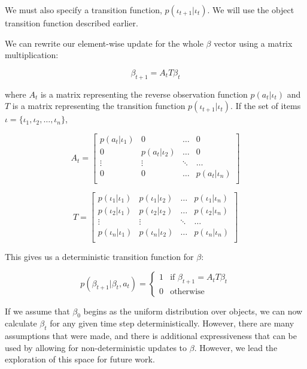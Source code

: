 \documentclass{article}
\begin{document}
\begin{multicols}{2}
We must also specify a transition function, $p(\iota_{t+1} | \iota_t)$. We will use the object transition function described earlier. 

We can rewrite our element-wise update for the whole $\beta$ vector using a matrix multiplication: 


$$\beta_{t+1} = A_{t}T \beta_{t}$$


where $A_{t}$ is a matrix representing the reverse observation function $p(a_{t} | \iota_t)$ and $T$ is a matrix representing the transition function $p(\iota_{t+1}|\iota_{t})$.  If the set of items $\mathcal{\iota} = \{ \iota_1, \iota_2, \ldots, \iota_n\}$, 

\begin{equation}
	A_{t} = \left[\begin{matrix} 
		p(a_{t} | \iota_1) & 0 & \ldots & 0 \\
		0 & p(a_{t} | \iota_2) & \ldots & 0 \\
		\vdots & \vdots & \ddots & \ldots  \\
		0 & 0 & \ldots  &  p(a_{t} | \iota_n) \\
	\end{matrix}
\right]
\end{equation}
		
\begin{equation}
	T = \left[\begin{matrix} 
			p(\iota_1 | \iota_1) & p(\iota_1| \iota_2)  & \ldots & p(\iota_1 | \iota_n) \\
			p(\iota_2 | \iota_1) & p(\iota_2 | \iota_2) & \ldots & p(\iota_2 | \iota_n) \\
			\vdots & \vdots & \ddots & \ldots  \\
			p(\iota_n | \iota_1) & p(\iota_n | \iota_2) & \ldots  &  p(\iota_n | \iota_n) \\
	\end{matrix}
\right]
\end{equation}

This gives us a deterministic transition function for $\beta$: 

\begin{equation}
	p(\beta_{t+1} | \beta_t, a_t) = \begin{cases}
		1 & \text{if } \beta_{t+1} = A_t T \beta_t \\
		0 & \text{otherwise}
	\end{cases}
\end{equation}

If we assume that $\beta_0$ begins as the uniform distribution over objects, we can now calculate $\beta_t$ for any given time step deterministically. However, there are many assumptions that were made, and there is additional expressiveness that can be used by allowing for non-deterministic updates to $\beta$. However, we lead the exploration of this space for future work. 


\end{multicols}
\end{document}
